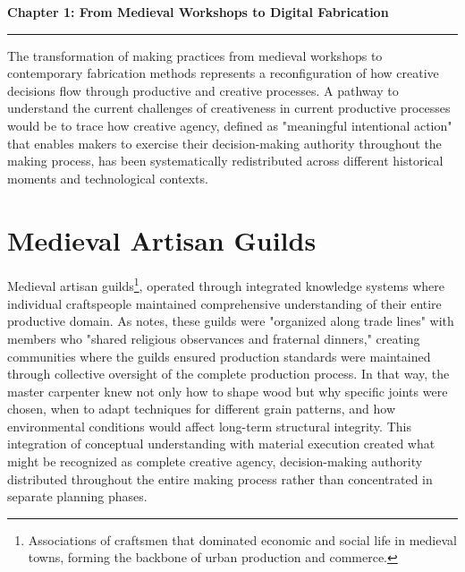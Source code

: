\setcounter{chapter}{1}
\setcounter{section}{0}

\pagestyle{fancy}
\fancyhf{} %
\fancyfoot[C]{\thepage} %
\renewcommand{\headrulewidth}{0pt}
\renewcommand{\footrulewidth}{0pt}

\noindent
{\Large\textbf{Chapter 1: From Medieval Workshops to Digital Fabrication}}
\vspace{0.3cm}
\hrule
\vspace{0.8cm}
\label{ch:introduction}

\setlength{\parindent}{0pt}

The transformation of making practices from medieval workshops to contemporary fabrication methods represents a reconfiguration of how creative decisions flow through productive and creative processes. A pathway to understand the current challenges of creativeness in current productive processes would be to trace how creative agency, defined as "meaningful intentional action" \citep{niedderer2024} that enables makers to exercise their decision-making authority throughout the making process, has been systematically redistributed across different historical moments and technological contexts.

\section{Medieval Artisan Guilds}

Medieval artisan guilds\footnote{Associations of craftsmen that dominated economic and social life in medieval towns, forming the backbone of urban production and commerce.}, operated through integrated knowledge systems where individual craftspeople maintained comprehensive understanding of their entire productive domain. As \citet{richardson2008} notes, these guilds were "organized along trade lines" with members who "shared religious observances and fraternal dinners," creating communities where the guilds ensured production standards were maintained through collective oversight of the complete production process. In that way, the master carpenter knew not only how to shape wood but why specific joints were chosen, when to adapt techniques for different grain patterns, and how environmental conditions would affect long-term structural integrity. This integration of conceptual understanding with material execution created what might be recognized as complete creative agency, decision-making authority distributed throughout the entire making process rather than concentrated in separate planning phases.

